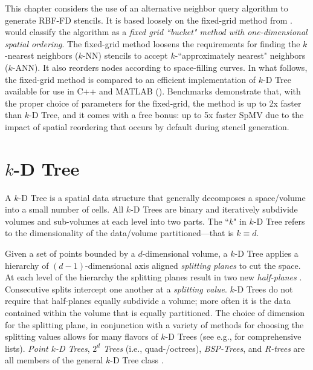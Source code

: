 \documentclass{report}
\begin{document}
This chapter considers the use of an alternative neighbor query algorithm to generate RBF-FD stencils. It is based loosely on the fixed-grid method from \cite{Krog2010,Green2010,Johnson2011}. \cite{Samet2005} would classify the algorithm as a \emph{fixed grid ``bucket" method with one-dimensional spatial ordering}. The fixed-grid method loosens the requirements for finding the $k$-nearest neighbors ($k$-NN) stencils to accept $k$-``approximately nearest" neighbors ($k$-ANN). It also reorders nodes according to space-filling curves. In what follows, the fixed-grid method is compared to an efficient implementation of $k$-D Tree available for use in C++ and MATLAB (\cite{TagliasacchiMFE}). Benchmarks demonstrate that, with the proper choice of parameters for the fixed-grid, the method is up to 2x faster than $k$-D Tree, and it comes with a free bonus: up to 5x faster SpMV due to the impact of spatial reordering that occurs by default during stencil generation. 


\section{$k$-D Tree}

A $k$-D Tree is a spatial data structure that generally decomposes a space/volume into a small number of cells. All $k$-D Trees are binary and iteratively subdivide volumes and sub-volumes at each level into two parts. The ``$k$" in $k$-D Tree refers to the dimensionality of the data/volume  partitioned---that is $k \equiv d$. 


Given a set of points bounded by a $d$-dimensional volume, a $k$-D Tree applies a hierarchy of $(d-1)$-dimensional axis aligned \emph{splitting planes} to cut the space. At each level of the hierarchy the splitting planes result in two new \emph{half-planes} \cite{Skiena2008}. Consecutive splits intercept one another at a \emph{splitting value}. $k$-D Trees do not require that half-planes equally subdivide a volume; more often it is the data contained within the volume that is equally partitioned. The choice of dimension for the splitting plane, in conjunction with a variety of methods for choosing the splitting values allows for many flavors of $k$-D Trees (see e.g., \cite{Samet2005, Skiena2008, Berg2008} for comprehensive lists). \emph{Point $k$-D Trees}, \emph{$2^d$ Trees} (i.e., quad-/octrees), \emph{BSP-Trees}, and \emph{R-trees} are all members of the general $k$-D Tree class \cite{Skiena2008,Ying2006}.
\end{document}
